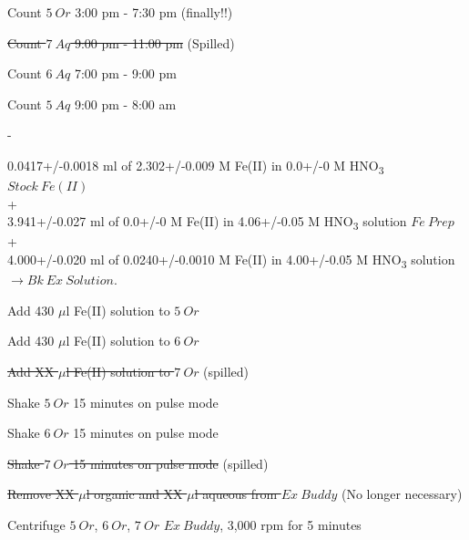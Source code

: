 \documentclass[idxtotoc,hyperref,openany,oneside]{labbook} %
\newcommand{\cmark}{\ding{51}}%
\newcommand{\done}{\rlap{$\square$}{\raisebox{2pt}{\large\hspace{1pt}\cmark}}%
  \hspace{-2.5pt}}
\newcommand{\tsbs}{\textsubscript}
\begin{document}
\begin{todolist}
\item[\done]{Count $\boxed{5\ Or}$ 3:00 pm - 7:30 pm (finally!!)}
\item{\st{Count $\boxed{7\ Aq}$ 9:00 pm - 11:00 pm} (Spilled)}
\item[\done]{Count $\boxed{6\ Aq}$ 7:00 pm - 9:00 pm}
\item[\done]{Count $\boxed{5\ Aq}$ 9:00 pm - 8:00 am}
\end{todolist}
\begin{todolist}
\item[\done]{-}
\end{todolist}
\begin{center}
0.0417+/-0.0018 ml of 2.302+/-0.009 M Fe(II) in 0.0+/-0 M HNO\tsbs{3} $\boxed{Stock\ Fe(II)}$\\
+\\
3.941+/-0.027 ml of 0.0+/-0 M Fe(II) in 4.06+/-0.05 M HNO\tsbs{3} solution $\boxed{Fe\ Prep}$\\
+\\
4.000+/-0.020 ml of 0.0240+/-0.0010 M Fe(II) in 4.00+/-0.05 M HNO\tsbs{3} solution $\boxed{\rightarrow Bk\ Ex\ Solution}$.
\end{center}
\begin{todolist}
\item[\done]{Add 430 $\mu$l Fe(II) solution to $\boxed{5\ Or}$}
\item[\done]{Add 430 $\mu$l Fe(II) solution to $\boxed{6\ Or}$}
\item{\st{Add XX $\mu$l Fe(II) solution to $\boxed{7\ Or}$} (spilled)}
\item[\done]{Shake $\boxed{5\ Or}$ 15 minutes on pulse mode}
\item[\done]{Shake $\boxed{6\ Or}$ 15 minutes on pulse mode}
\item{\st{Shake $\boxed{7\ Or}$ 15 minutes on pulse mode} (spilled)}
\item{\st{Remove XX $\mu$l organic and XX $\mu$l aqueous
  from $\boxed{Ex\ Buddy}$} (No longer necessary)}
\item[\done]{Centrifuge $\boxed{5\ Or}$, $\boxed{6\ Or}$, \st{$\boxed{7\ Or}$}
  \st{$\boxed{Ex\ Buddy}$}, 3,000 rpm for 5 minutes}
\end{todolist}
\end{document}

